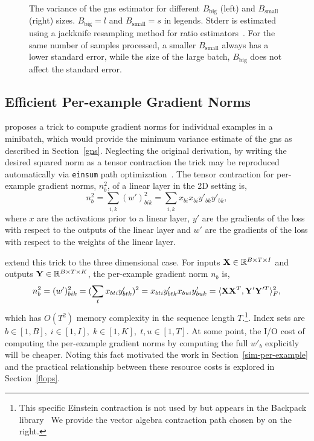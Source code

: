 \documentclass{article}
\newcommand{\Bbig}{B_{\textrm{big}}}
\newcommand{\Bsmall}{B_{\textrm{small}}}
\newcommand{\Rbb}{\mathbb{R}}
\begin{document}
\begin{figure}
\begin{subfigure}[b]{0.39\textwidth}
        \label{fig:smallvariance}
    \end{subfigure}
    \caption{%
        The variance of the \ac{gns} estimator for different $\Bbig$ (left) and
        $\Bsmall$ (right) sizes. $\Bbig = l$ and $\Bsmall = s$ in legends.
        Stderr is estimated using a jackknife resampling method for ratio
        estimators~\citep{choquet1999bootstrap}. For the same number of samples
        processed, a smaller $\Bsmall$ always has a lower standard error, while
        the size of the large batch, $\Bbig$ does not affect the standard error.}
    \label{fig:variance}
\end{figure}

\subsection{Efficient Per-example Gradient Norms}\label{per-example}


\citet{goodfellow2015efficient} proposes a trick to compute gradient norms for
individual examples in a minibatch, which would provide the minimum variance
estimate of the \ac{gns} as described in Section~\ref{gns}. Neglecting the
original derivation, by writing
the desired squared norm as a tensor contraction the trick may be reproduced
automatically via \texttt{einsum} path optimization~\citep{smith2018opt_einsum,dangel2020backpack}.
The tensor contraction for per-example gradient norms, $n_{b}^2$, of a linear layer in the
2D setting is,
\[
    n_{b}^2 = \sum_{i,k} (w')^2_{bik} = \sum_{i, k} x_{bi} x_{bi} y'_{bk} y'_{bk},
\]
where $x$ are the activations prior to a linear layer, $y'$ are the gradients
of the loss with respect to the outputs of the linear layer and $w'$ are the
gradients of the loss with respect to the weights of the linear layer.

\citet{li2022large} extend this trick to the three dimensional case.
For inputs $\XB \in \Rbb^{B \times T \times I}$ and outputs $\YB \in \Rbb^{B
\times T \times K}$, the per-example gradient norm $n_{b}$ is,
\[
    n_{b}^2 = (w')^2_{bik} = (\sum_t x_{bti} y'_{btk})^2 = x_{bti} y'_{btk} x_{bui} y'_{buk} = \langle \mathbf{X} \mathbf{X}^T, \mathbf{Y}' \mathbf{Y}'^T \rangle_F^2,
\]
which has $O(T^2)$ memory complexity in the sequence length $T$.\footnote{This specific Einstein contraction is not used by \citet{li2022large}
but appears in the Backpack library~\citep{dangel2020backpack} We provide the
vector algebra contraction path chosen by \citet{li2022large} on the right.}.
Index sets are $b \in [1,B], \; i \in [1,I], \; k \in [1,K], \; t,u \in [1,T]$.
At some point, the I/O cost of computing the per-example gradient norms
by computing the full $w'_b$ explicitly will be cheaper.
Noting this fact motivated the work in Section~\ref{sim-per-example} and the
practical relationship between these resource costs is explored in Section~\ref{flops}.
\end{document}
